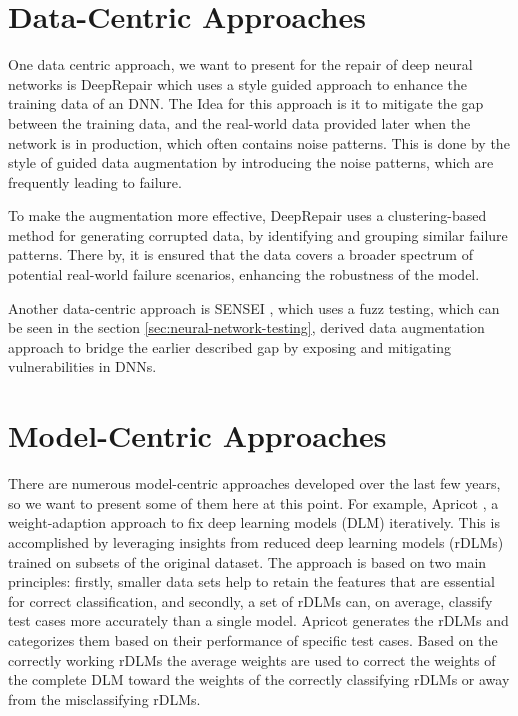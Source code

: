 \section{Data-Centric Approaches}\label{sec:data-centric-approaches}
One data centric approach, we want to present for the repair of deep neural networks is DeepRepair \cite{yu_deeprepair_2022} which uses a style guided approach to enhance the training data of an DNN. The Idea for this approach is it to mitigate the gap between the training data, and the real-world data provided later when the network is in production, which often contains noise patterns.
This is done by the style of guided data augmentation by introducing the noise patterns, which are frequently leading to failure.

To make the augmentation more effective, DeepRepair uses a clustering-based method for generating corrupted data, by identifying and grouping similar failure patterns.
There by, it is ensured that the data covers a broader spectrum of potential real-world failure scenarios, enhancing the robustness of the model.

Another data-centric approach is SENSEI \cite{gao_fuzz_2020}, which uses a fuzz testing, which can be seen in the section \ref{sec:neural-network-testing}, derived data augmentation approach to bridge the earlier described gap by exposing and mitigating vulnerabilities in DNNs.

\section{Model-Centric Approaches}\label{sec:model-centric-approaches}
There are numerous model-centric approaches developed over the last few years, so we want to present some of them here at this point.
For example, Apricot \cite{zhang_apricot_2019}, a weight-adaption approach to fix deep learning models (DLM) iteratively.
This is accomplished by leveraging insights from reduced deep learning models (rDLMs) trained on subsets of the original dataset.
The approach is based on two main principles: firstly, smaller data sets help to retain the features that are essential for correct classification, and secondly, a set of rDLMs can, on average, classify test cases more accurately than a single model.
Apricot generates the rDLMs and categorizes them based on their performance of specific test cases.
Based on the correctly working rDLMs the average weights are used to correct the weights of the complete DLM toward the weights of the correctly classifying rDLMs or away from the misclassifying rDLMs.

